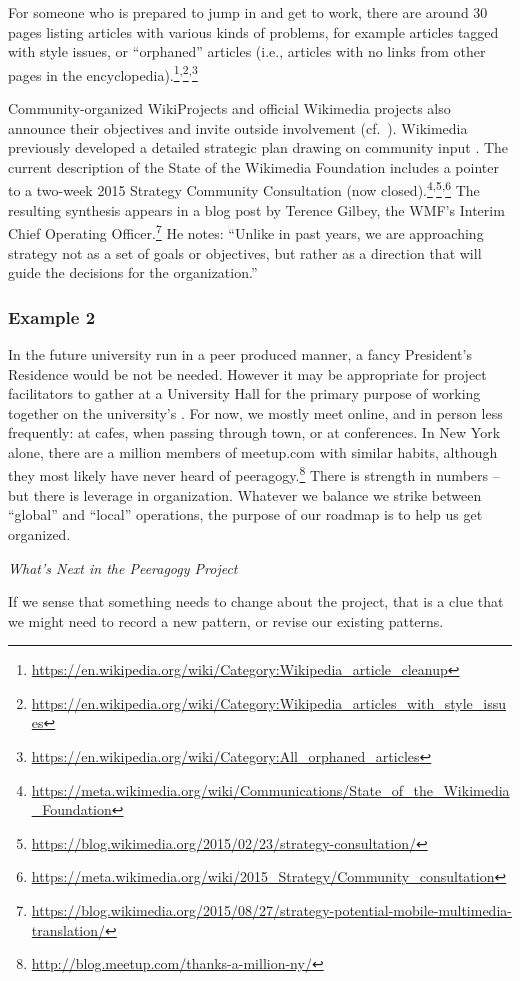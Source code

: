 For someone who is prepared to jump in and get to work, there are
around 30 pages listing articles with various kinds of problems, for
example articles tagged with style issues, or ``orphaned'' articles
(i.e., articles with no links from other pages in the
encyclopedia).\footnote{\url{https://en.wikipedia.org/wiki/Category:Wikipedia_article_cleanup}}\textsuperscript{,}\footnote{\url{https://en.wikipedia.org/wiki/Category:Wikipedia_articles_with_style_issues}}\textsuperscript{,}\footnote{\url{https://en.wikipedia.org/wiki/Category:All_orphaned_articles}}

Community-organized WikiProjects and official Wikimedia projects also announce their objectives  and invite outside involvement (cf.~).  Wikimedia previously developed
a detailed strategic plan drawing on community input
\cite{wikimedia2011plan}.  The current description of the State of
the Wikimedia Foundation includes a pointer to a two-week 2015
Strategy Community Consultation (now closed).\footnote{\url{https://meta.wikimedia.org/wiki/Communications/State_of_the_Wikimedia_Foundation}}\textsuperscript{,}\footnote{\url{https://blog.wikimedia.org/2015/02/23/strategy-consultation/}}\textsuperscript{,}\footnote{\url{https://meta.wikimedia.org/wiki/2015_Strategy/Community_consultation}}  The resulting synthesis appears in a blog post by Terence Gilbey, the WMF's Interim Chief Operating Officer.\footnote{\url{https://blog.wikimedia.org/2015/08/27/strategy-potential-mobile-multimedia-translation/}}  He notes: ``Unlike in past years, we are approaching strategy not as a set of goals or objectives, but rather as a direction that will guide the decisions for the organization.''

\subsubsection*{Example 2}
In the future university run in a peer produced manner, a fancy
President's Residence would be not be needed.  However it may be
appropriate for project facilitators to gather at a University Hall
for the primary purpose of working together on the university's
.  For now, we mostly meet online, and in person
less frequently: at cafes, when passing through town, or at
conferences.  In New York alone, there are a million members of
meetup.com with similar habits, although they most likely have never
heard of
peeragogy.\footnote{\url{http://blog.meetup.com/thanks-a-million-ny/}}
There is strength in numbers -- but there is leverage in organization.
Whatever we balance we strike between ``global'' and ``local''
operations, the purpose of our roadmap is to help us get organized.

\begin{framed}
\noindent
\emph{What's Next in the Peeragogy Project}
\begin{collectinmacro}{\RoadmapWN}{}{}
If we sense that something needs to change about the project, that is a clue that we might need to record a new pattern, or revise our existing patterns.
\end{collectinmacro}
\RoadmapWN
\end{framed}
